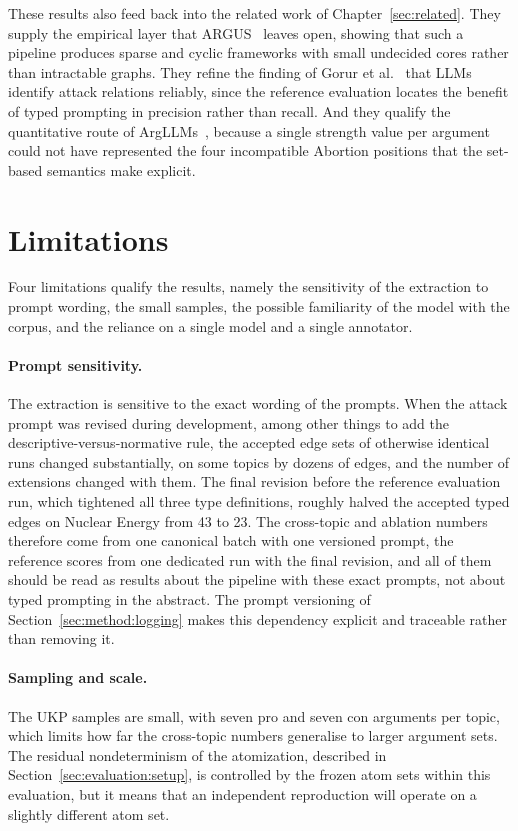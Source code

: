 These results also feed back into the related work of
Chapter~\ref{sec:related}. They supply the empirical layer that
ARGUS~\cite{argus} leaves open, showing that such a pipeline produces sparse
and cyclic frameworks with small undecided cores rather than intractable
graphs. They refine the finding of Gorur et al.~\cite{gorur2025relMining} that
LLMs identify attack relations reliably, since the reference evaluation locates the
benefit of typed prompting in precision rather than recall. And they qualify
the quantitative route of ArgLLMs~\cite{argLLMs}, because a single strength
value per argument could not have represented the four incompatible Abortion
positions that the set-based semantics make explicit.

\section{Limitations}
\label{sec:discussion:threats}

Four limitations qualify the results, namely the sensitivity of the extraction to
prompt wording, the small samples, the possible familiarity of the model with
the corpus, and the reliance on a single model and a single annotator.

\paragraph{Prompt sensitivity.} The extraction is sensitive to the exact
wording of the prompts. When the attack prompt was revised during development,
among other things to add the descriptive-versus-normative rule, the accepted
edge sets of otherwise identical runs changed substantially, on some topics by
dozens of edges, and the number of extensions changed with them. The final
revision before the reference evaluation run, which tightened all three type definitions,
roughly halved the accepted typed edges on Nuclear Energy from 43 to 23. The
cross-topic and ablation numbers therefore come from one canonical batch with
one versioned prompt, the reference scores from one dedicated run with the final
revision, and all of them should be read as results about the pipeline with
these exact prompts, not
about typed prompting in the abstract. The prompt versioning of
Section~\ref{sec:method:logging} makes this dependency explicit and traceable
rather than removing it.

\paragraph{Sampling and scale.} The UKP samples are small, with seven pro and seven con
arguments per topic, which limits how far the cross-topic numbers generalise to
larger argument sets. The residual nondeterminism of the atomization, described
in Section~\ref{sec:evaluation:setup}, is controlled by the frozen atom sets
within this evaluation, but it means that an independent reproduction will
operate on a slightly different atom set.

